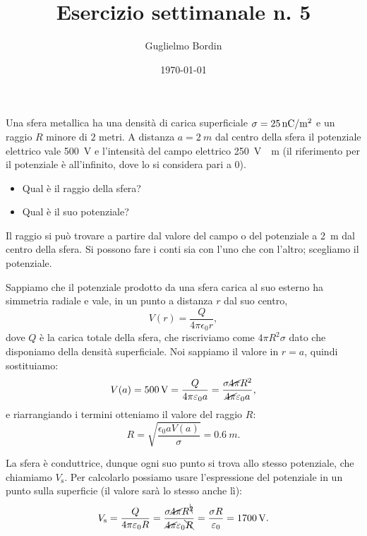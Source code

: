\documentclass[10pt]{gulartcl}
\title{Esercizio settimanale n. 5}
\author{Guglielmo Bordin}
\date{\today}
\begin{document}
\maketitle

\noindent
Una sfera metallica ha una densità di carica superficiale $\sigma =
\qty{25}{nC\per m\squared}$ e un raggio $R$ minore di $2$ metri. A distanza
$a = \qty{2}{m}$ dal centro della sfera il potenziale elettrico vale
\qty{500}{V} e l’intensità del campo elettrico \qty{250}{V \per m} (il
riferimento per il potenziale è all’infinito, dove lo si considera pari a
$0$).

\begin{itemize}
    \item Qual è il raggio della sfera?
    \item Qual è il suo potenziale?
\end{itemize}

\begin{solution}
Il raggio si può trovare a partire dal valore del campo o del potenziale a
\qty{2}{m} dal centro della sfera. Si possono fare i conti sia con l’uno
che con l’altro; scegliamo il potenziale.

Sappiamo che il potenziale prodotto da una sfera carica al suo esterno ha
simmetria radiale e vale, in un punto a distanza $r$ dal suo centro,
\begin{equation}
    V(r) = \frac{Q}{4\pi\epsilon_0 r},
\end{equation}
dove $Q$ è la carica totale della sfera, che riscriviamo come $4\pi R^2 \sigma$
dato che disponiamo della densità superficiale. Noi sappiamo il valore in
$r = a$, quindi sostituiamo:
\begin{equation}
    V(a) = \qty{500}{V} = \frac{Q}{4\pi\varepsilon_0 a} =
    \frac{\sigma\cancel{4 \pi} R^2}{\cancel{4\pi} \varepsilon_0 a},
\end{equation}
e riarrangiando i termini otteniamo il valore del raggio $R$:
\begin{equation}
    R = \sqrt{\frac{\epsilon_0 a V(a)}{\sigma}} = \qty{0.6}{m}.
\end{equation}

La sfera è conduttrice, dunque ogni suo punto si trova allo stesso
potenziale, che chia\-mia\-mo $V_{\mathrm{s}}$. Per calcolarlo possiamo usare
l’espressione del potenziale in un punto sulla superficie (il valore sarà
lo stesso anche lì):
\begin{equation}
    V_{\mathrm{s}} = \frac{Q}{4\pi\varepsilon_0 R} = \frac{\sigma \cancel{4\pi}
    R^{\bcancel{2}}}{\cancel{4\pi}\varepsilon_0 \bcancel{R}} = \frac{\sigma
    R}{\varepsilon_0} = \qty{1700}{V}.
\end{equation}
\end{solution}
\end{document}
